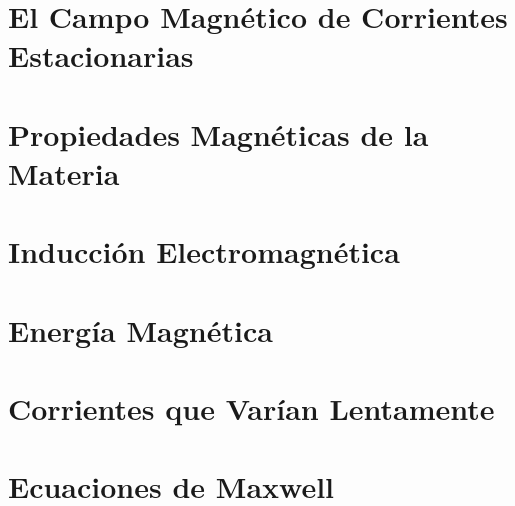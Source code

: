\chapter{El Campo Magnético de Corrientes Estacionarias}









\chapter{Propiedades Magnéticas de la Materia}













\chapter{Inducción Electromagnética}














\chapter{Energía Magnética}













\chapter{Corrientes que Varían Lentamente}















\chapter{Ecuaciones de Maxwell}














